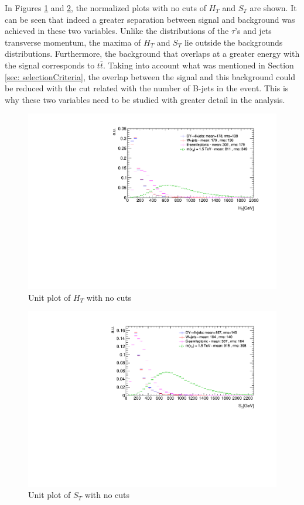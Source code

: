 In Figures \ref{fig: HTunitNC} and \ref{fig: STunitNC}, the normalized plots with no cuts of $H_{T}$ and $S_{T}$ are shown. It can be seen that indeed a greater separation between signal and background was achieved in these two variables. Unlike the distributions of the $\tau$'s and jets transverse momentum, the maxima of $H_{T}$ and $S_{T}$ lie outside the backgrounds distributions. Furthermore, the background that overlaps at a greater energy with the signal corresponds to $t\bar{t}$. Taking into account what was mentioned in Section \ref{sec: selectionCriteria}, the overlap between the signal and this background could be reduced with the cut related with the number of B-jets in the event. This is why these two variables need to be studied with greater detail in the analysis.

\begin{figure}
\includegraphics[width=\linewidth]{Plots/HT_unitNC.pdf}
\caption{Unit plot of $H_{T}$ with no cuts}
\label{fig: HTunitNC}
\end{figure}

\begin{figure}
\centering
\includegraphics[width=\linewidth]{Plots/ST_unitNC.pdf}
\caption{Unit plot of $S_{T}$ with no cuts}
\label{fig: STunitNC}
\end{figure}

